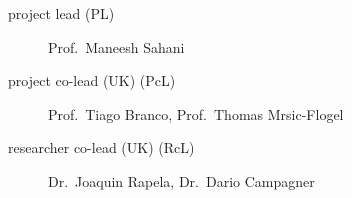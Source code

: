 
\begin{description}
    \item[project lead (PL)] Prof.~Maneesh Sahani
    \item[project co-lead (UK) (PcL)] Prof.~Tiago Branco, Prof.~Thomas Mrsic-Flogel
    \item[researcher co-lead (UK) (RcL)] Dr.~Joaquin Rapela, Dr.~Dario Campagner
\end{description}
